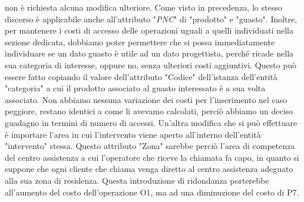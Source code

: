 \documentclass[a4paper, 12pt]{report}
\begin{document}
non è richiesta alcuna modifica ulteriore. Come visto in precedenza, lo stesso discorso è applicabile anche all'attributo "\textit{PNC}" di "prodotto" e "guasto".\newline
Inoltre, per mantenere i costi di accesso delle operazioni uguali a quelli individuati nella sezione dedicata, dobbiamo poter permettere che si possa immediatamente
individuare se un dato guasto è utile ad un dato progettista, perché ricade nella sua categoria di interesse, oppure no, senza ulteriori costi aggiuntivi. Questo può essere fatto
copiando il valore dell'attributo "Codice" dell'istanza dell'entità "categoria" a cui il prodotto associato al guasto interessato è a sua volta associato. Non abbiamo nessuna
variazione dei costi per l'inserimento nel caso peggiore, restano identici a come li avevamo calcolati, perciò abbiamo un deciso guadagno in termini di numero di accessi.\newline
Un'altra modifica che si può effettuare è importare l'area in cui l'intervento viene aperto all'interno dell'entità "intervento" stessa. Questo attributo "Zona" sarebbe perciò
l'area di competenza del centro assistenza a cui l'operatore che riceve la chiamata fa capo, in quanto si suppone che ogni cliente che chiama venga diretto al centro assistenza 
adeguato alla sua zona di residenza. Questa introduzione di ridondanza porterebbe all'aumento del costo dell'operazione O1, ma ad una diminuzione del costo di P7.
\end{document}
